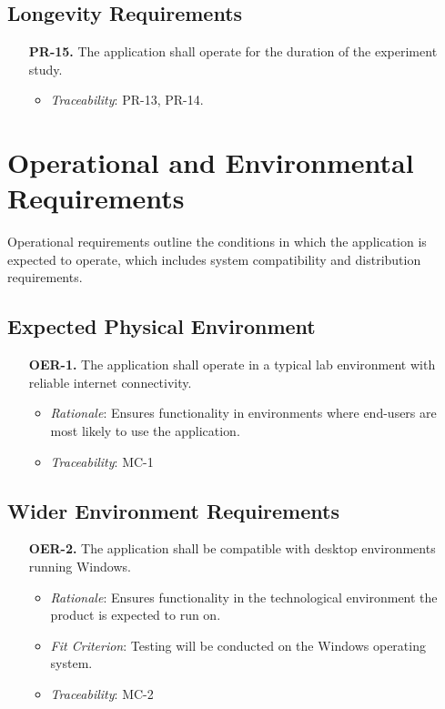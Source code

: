 \documentclass[12pt]{article}
\begin{document}
\subsection{Longevity Requirements}
\begin{enumerate}
  \item[\textbf{PR-15.}] The application shall operate for the duration of the experiment study.
  \begin{itemize}
    \item \textit{Traceability}: PR-13, PR-14.
  \end{itemize}
\end{enumerate}

\section{Operational and Environmental Requirements}
Operational requirements outline the conditions in which the application is expected to operate, which includes system compatibility and distribution requirements.
\subsection{Expected Physical Environment}
\begin{enumerate}
  \item[\textbf{OER-1.}] The application shall operate in a typical lab environment with reliable internet connectivity.
    \begin{itemize}
      \item \textit{Rationale}: Ensures functionality in environments where end-users are most likely to use the application. 
      \item \textit{Traceability}: MC-1
    \end{itemize}
\end{enumerate}

\subsection{Wider Environment Requirements}
\begin{enumerate}
  \item[\textbf{OER-2.}] The application shall be compatible with desktop environments running Windows.
    \begin{itemize}
      \item \textit{Rationale}: Ensures functionality in the technological environment the product is expected to run on.
      \item \textit{Fit Criterion}: Testing will be conducted on the Windows operating system.
      \item \textit{Traceability}: MC-2
    \end{itemize}
\end{enumerate}
\end{document}
